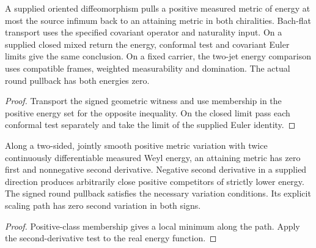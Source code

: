 \begin{proposition}
\label{prop:ed47-return}
\leanok
A supplied oriented diffeomorphism pulls a positive measured metric of
energy at most the source infimum back to an attaining metric in both
chiralities. Bach-flat transport uses the specified covariant operator
and naturality input. On a supplied closed mixed return the energy,
conformal test and covariant Euler limits give the same conclusion. On
a fixed carrier, the two-jet energy comparison uses compatible frames,
weighted measurability and domination. The actual round pullback has both
energies zero.
\end{proposition}
\begin{proof}
\leanok
Transport the signed geometric witness and use membership in the positive
energy set for the opposite inequality. On the closed limit pass each
conformal test separately and take the limit of the supplied Euler identity.
\end{proof}

\begin{proposition}
\label{prop:ed47-variation}
\leanok
Along a two-sided, jointly smooth positive metric variation with twice
continuously differentiable measured Weyl energy, an attaining metric
has zero first and nonnegative second derivative. Negative second
derivative in a supplied direction produces arbitrarily close positive
competitors of strictly lower energy. The signed round pullback satisfies
the necessary variation conditions. Its explicit scaling path has zero second variation in both signs.
\end{proposition}
\begin{proof}
\leanok
Positive-class membership gives a local minimum along the path.
Apply the second-derivative test to the real energy function.
\end{proof}

